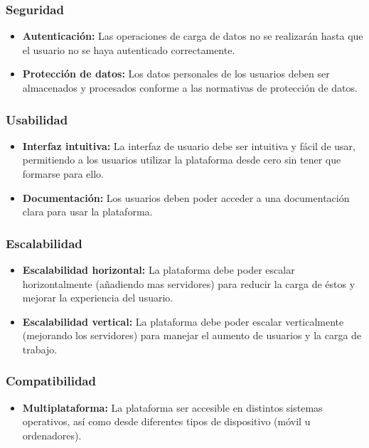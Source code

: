 \subsubsection{Seguridad}
\begin{itemize}
    \item \textbf{Autenticación:} Las operaciones de carga de datos no se realizarán hasta que el usuario no se haya autenticado correctamente.
    
    \item \textbf{Protección de datos:} Los datos personales de los usuarios deben ser almacenados y procesados conforme a las normativas de protección de datos.
    
\end{itemize}

\subsubsection{Usabilidad}
\begin{itemize}
    \item \textbf{Interfaz intuitiva:} La interfaz de usuario debe ser intuitiva y fácil de usar, permitiendo a los usuarios utilizar la plataforma desde cero sin tener que formarse para ello.
    
    \item \textbf{Documentación:} Los usuarios deben poder acceder a una documentación clara para usar la plataforma.
    
\end{itemize}

\subsubsection{Escalabilidad}
\begin{itemize}
    \item \textbf{Escalabilidad horizontal:} La plataforma debe poder escalar horizontalmente (añadiendo mas servidores) para reducir la carga de éstos y mejorar la experiencia del usuario.
    
    \item \textbf{Escalabilidad vertical:} La plataforma debe poder escalar verticalmente (mejorando los servidores) para manejar el aumento de usuarios y la carga de trabajo.
    
\end{itemize}

\subsubsection{Compatibilidad}
\begin{itemize}
    \item \textbf{Multiplataforma:} La plataforma ser accesible en distintos sistemas operativos, así como desde diferentes tipos de dispositivo (móvil u ordenadores).
    
\end{itemize}

